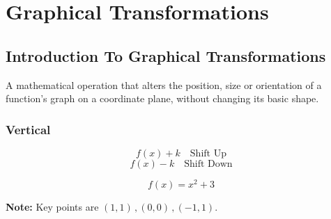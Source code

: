 \section{Graphical Transformations}
\subsection{Introduction To Graphical Transformations}
\begin{definition}
  A mathematical operation that alters the position, size or orientation of a function's graph on a coordinate plane, without changing its basic shape.
\end{definition}
\subsubsection{Vertical}
\begin{definition}
  \hfill
  $$f(x) + k \quad \text{Shift Up}$$
  $$f(x) - k \quad \text{Shift Down}$$
\end{definition}
\begin{example}
  \hfill
  $$f(x) = x^2 + 3$$
  \begin{center}
  \end{center}
  \textbf{Note: } Key points are $(1, 1) \, , (0, 0) \, , (-1, 1)$.
\end{example}
